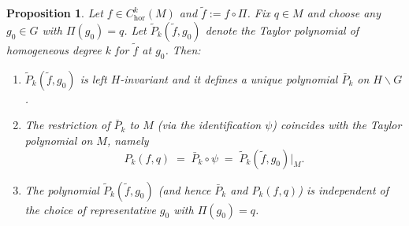 \documentclass[12pt]{amsart}
\newtheorem{proposition}{Proposition}[section]
\begin{document}
\begin{proposition}
\label{prop:compatibility}
Let \(f\in C_{\mathrm{hor}}^{k}(M)\) and \(\tilde f := f\circ\Pi\).
Fix \(q\in M\) and choose any \(g_0\in G\) with \(\Pi(g_0)=q\).
Let \(\tilde P_k(\tilde f,g_0)\) denote the  Taylor polynomial of homogeneous degree \(k\) for \(\tilde f\) at \(g_0\).
Then:
\begin{enumerate}
\item \(\tilde P_k(\tilde f,g_0)\) is left \(H\)-invariant and it defines a unique polynomial \(\bar P_k\) on \(H\backslash G\).
\item The restriction of \(\bar P_k\) to \(M\) (via the identification \(\psi\)) coincides with the Taylor polynomial on \(M\), namely
\[
P_{k}(f,q) \;=\; \bar P_k\circ\psi \;=\; \tilde P_k(\tilde f,g_0)\big|_{M}.
\]
\item The polynomial \(\tilde P_k(\tilde f,g_0)\) (and hence \(\bar P_k\) and \(P_k(f,q)\)) is independent of the choice of representative \(g_0\) with \(\Pi(g_0)=q\).
\end{enumerate}
\end{proposition}
\end{document}
